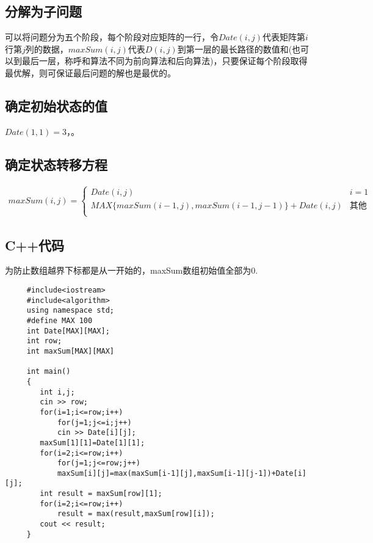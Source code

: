 \documentclass{article}
\begin{document}
     \subsection{分解为子问题}
     可以将问题分为五个阶段，每个阶段对应矩阵的一行，令$Date(i,j)$代表矩阵第$i$行第$j$列的数据，$maxSum(i,j)$代表$D(i,j)$到第一层的最长路径的数值和(也可以到最后一层，称呼和算法不同为前向算法和后向算法)，只要保证每个阶段取得最优解，则可保证最后问题的解也是最优的。
     \subsection{确定初始状态的值}
     $Date(1,1)=3$，。
     \subsection{确定状态转移方程}
     \begin{align*}
     maxSum(i,j) = \begin{cases}
     Date(i,j) & i=1 \\
     MAX\{maxSum(i-1,j),maxSum(i-1,j-1)\}+Date(i,j) & \text{其他}\\
     \end{cases}
     \end{align*}
     \subsection{C++代码}
     为防止数组越界下标都是从一开始的，maxSum数组初始值全部为0.
     \begin{lstlisting}
     #include<iostream>
     #include<algorithm>
     using namespace std;
     #define MAX 100
     int Date[MAX][MAX];
     int row;
     int maxSum[MAX][MAX]
     
     int main()
     {
     	int i,j;
     	cin >> row;
     	for(i=1;i<=row;i++)
     		for(j=1;j<=i;j++)
     		cin >> Date[i][j];
     	maxSum[1][1]=Date[1][1];
     	for(i=2;i<=row;i++)
     		for(j=1;j<=row;j++)
     		maxSum[i][j]=max(maxSum[i-1][j],maxSum[i-1][j-1])+Date[i][j];
     	int result = maxSum[row][1];
     	for(i=2;i<=row;i++)
     		result = max(result,maxSum[row][i]); 
     	cout << result;
     }
     \end{lstlisting}
\end{document}
